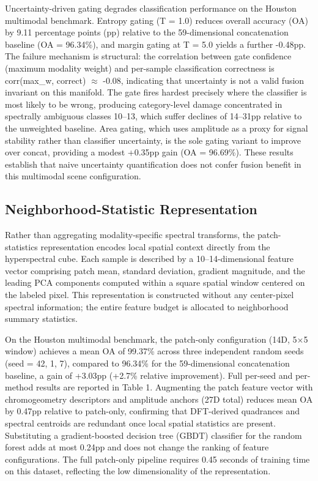 \documentclass[
  journal]{IEEEtran}
\begin{document}
Uncertainty-driven gating degrades classification performance on the
Houston multimodal benchmark. Entropy gating (T = 1.0) reduces overall
accuracy (OA) by 9.11 percentage points (pp) relative to the
59-dimensional concatenation baseline (OA = 96.34\%), and margin gating
at T = 5.0 yields a further -0.48pp. The failure mechanism is
structural: the correlation between gate confidence (maximum modality
weight) and per-sample classification correctness is corr(max\_w,
correct) \(\approx\) -0.08, indicating that uncertainty is not a valid fusion
invariant on this manifold. The gate fires hardest precisely where the
classifier is most likely to be wrong, producing category-level damage
concentrated in spectrally ambiguous classes 10--13, which suffer
declines of 14--31pp relative to the unweighted baseline. Area gating,
which uses amplitude as a proxy for signal stability rather than
classifier uncertainty, is the sole gating variant to improve over
concat, providing a modest +0.35pp gain (OA = 96.69\%). These results
establish that naive uncertainty quantification does not confer fusion
benefit in this multimodal scene configuration.

\subsection{Neighborhood-Statistic
Representation}\label{neighborhood-statistic-representation-1}

Rather than aggregating modality-specific spectral transforms, the
patch-statistics representation encodes local spatial context directly
from the hyperspectral cube. Each sample is described by a
10--14-dimensional feature vector comprising patch mean, standard
deviation, gradient magnitude, and the leading PCA components computed
within a square spatial window centered on the labeled pixel. This
representation is constructed without any center-pixel spectral
information; the entire feature budget is allocated to neighborhood
summary statistics.

On the Houston multimodal benchmark, the patch-only configuration (14D,
5\(\times\)5 window) achieves a mean OA of 99.37\% across three independent
random seeds (seed = 42, 1, 7), compared to 96.34\% for the
59-dimensional concatenation baseline, a gain of +3.03pp (+2.7\%
relative improvement). Full per-seed and per-method results are reported
in Table 1. Augmenting the patch feature vector with chromogeometry
descriptors and amplitude anchors (27D total) reduces mean OA by 0.47pp
relative to patch-only, confirming that DFT-derived quadrances and
spectral centroids are redundant once local spatial statistics are
present. Substituting a gradient-boosted decision tree (GBDT) classifier
for the random forest adds at most 0.24pp and does not change the
ranking of feature configurations. The full patch-only pipeline requires
0.45 seconds of training time on this dataset, reflecting the low
dimensionality of the representation.
\end{document}
